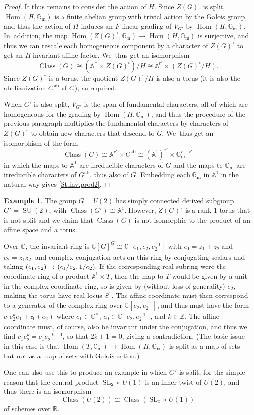 \documentclass[JEP,XML,SOM,Unicode,NoFloatCountersInSection,published]{cedram}
\newcommand\mto{\mathchoice{\longmapsto}{\mapsto}{\mapsto}{\mapsto}}
\theoremstyle{definition}
\newtheorem{example}[equation]{Example}
\let\ic\circ
\newcommand{\A}{\mathbb{A}}
\newcommand{\R}{\mathbb{R}}
\newcommand{\C}{\mathbb{C}}
\newcommand{\Z}{\mathbb{Z}}
\newcommand{\Gm}{\mathbb{G}_{\mathrm{m}}}
\DeclareMathOperator{\SL}{SL}
\DeclareMathOperator{\SU}{SU}
\DeclareMathOperator{\class}{Class}
\newcommand{\ClG}{\class(G)}
\DeclareMathOperator{\Hom}{Hom}
\begin{document}
\begin{proof}
It thus remains to consider the action of $H$. Since
$Z(G)^\ic$ is split, $\Hom(H,\Gm)$ is a finite abelian group with trivial
action by the Galois group, and thus the action of $H$ induces an
$F$-linear grading of $V_{G'}$ by $\Hom(H,\Gm)$. In~addition, the map
$\Hom(Z(G)^\ic,\Gm)\to \Hom(H,\Gm)$ is surjective, and thus we can rescale
each homogeneous component by a character of $Z(G)^\ic$ to get an
$H$-invariant affine factor. We~thus get an isomorphism
\[
\class(G)\cong (\A^{r'}\times Z(G)^\ic)/H
\cong \A^{r'}\times (Z(G)^\ic/H).
\]
Since $Z(G)^\ic$ is a torus, the quotient $Z(G)^\ic/H$ is also a torus (it is also the abelianization $G^\text{ab}$ of $G$),
as required.

When $G'$ is also split, $V_{G'}$ is the span of fundamental characters,
all of which are homogeneous for the grading by $\Hom(H,\Gm)$, and thus the
procedure of the previous paragraph multiplies the fundamental characters
by characters of $Z(G)^\ic$ to obtain new characters that descend to $G$. We~thus get an isomorphism of the form
\[
\class(G)\cong \A^{r'}\times G^{\text{ab}}\cong (\A^1)^{r'}\times
\Gm^{r-r'}
\]
in which the maps to $\A^1$ are irreducible characters of $G$ and the maps
to $\Gm$ are irreducible characters of $G^{\text{ab}}$, thus also of $G$.
Embedding each $\Gm$ in $\A^1$ in the natural way gives \eqref{St.inv.prod2}.
\end{proof}

\begin{example}
The group $G = U(2)$ has simply connected derived subgroup $G' =
\SU(2)$, with $\class(G')\cong \A^1$. However, $Z(G)^\ic$ is a rank $1$
torus that is not split and we claim that $\ClG$ is not isomorphic to the
product of an affine space and a torus.

Over $\C$, the invariant ring is $\C[G]^G \cong \C[e_1,e_2,e_2^{-1}]$
with $e_1=z_1+z_2$ and $e_2=z_1z_2$, and complex conjugation acts on this
ring by conjugating scalars and taking $(e_1,e_2)\mto
(e_1/e_2,1/e_2)$. If the corresponding real subring were the coordinate
ring of a product $\A^1\times T$, then the map to $T$ would be given by a
unit in the complex coordinate ring, so is given by (without loss of
generality) $e_2$, making the torus have real locus $S^1$. The affine
coordinate must then correspond to a generator of the complex ring over
$\C[e_2,e_2^{-1}]$, and thus must have the form $c_1 e_2^k e_1 +
c_0(e_2)$ where $c_1\in \C^\times$, $c_0\in \C[e_2,e_2^{-1}]$, and $k\in
\Z$. The affine coordinate must, of course, also be invariant under the
conjugation, and thus we find $c_1 e_2^k = \bar{c_1} e_2^{-k-1}$, so that
$2k+1=0$, giving a contradiction. (The basic issue in this case is that
$\Hom(T,\Gm)\to \Hom(H,\Gm)$ is split as a map of sets but not as a map
of sets with Galois action.)

One can also use this to produce an example in which $G'$ is split, for
the simple reason that the central product $\SL_2 \circ\ U(1)$ is an inner
twist of $U(2)$, and thus there is an isomorphism
\[
\class(U(2))\cong \class(\SL_2 \circ\ U(1))
\]
of schemes over $\R$.
\end{example}
\end{document}
